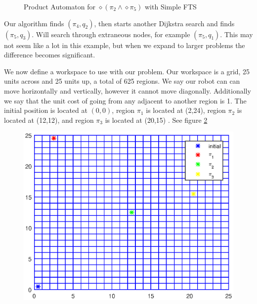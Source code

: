 \begin{figure}
\caption{Product Automaton for $\diamond (\pi_2 \wedge \diamond \pi_5)$ with Simple FTS}
\label{fig:Sequencing}
\end{figure}

Our algorithm finds $(\pi_4,q_2)$, then starts another Dijkstra search and finds $(\pi_5,q_3)$. Will search through extraneous nodes, for example $(\pi_5,q_1)$. This may not seem like a lot in this example, but when we expand to larger problems the difference becomes significant.

We now define a workspace to use with our problem. Our workspace is a grid, 25 units across and 25 units up, a total of 625 regions. We say our robot can can move horizontally and vertically, however it cannot move diagonally. Additionally we say that the unit cost of going from any adjacent to another region is 1. The initial position is located at $(0,0)$, region $\pi_1$ is located at (2,24), region $\pi_2$ is located at (12,12), and region $\pi_3$ is located at (20,15) . See figure \ref{fig:workspace}

\begin{figure}[!htb]
\centering
\includegraphics[scale=1]{workspace.eps}
\label{fig:workspace}
\end{figure}


